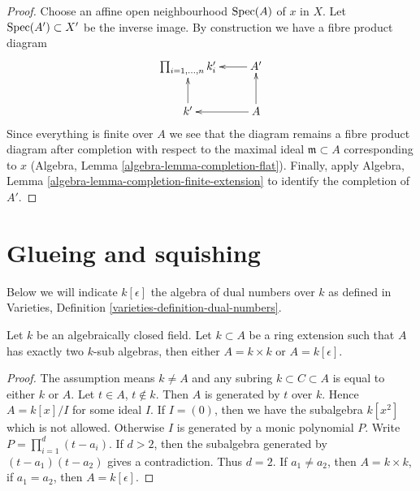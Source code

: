 \begin{proof}
Choose an affine open neighbourhood $\mathop{\mathrm{Spec}}(A)$ of $x$ in $X$.
Let $\mathop{\mathrm{Spec}}(A') \subset X'$ be the inverse image. By construction
we have a fibre product diagram
$$
\xymatrix{
\prod\nolimits_{i = 1, \ldots, n} k'_i &
A' \ar[l] \\
k' \ar[u] &
A \ar[u] \ar[l]
}
$$
Since everything is finite over $A$ we see that the diagram remains
a fibre product diagram after completion with respect to the
maximal ideal $\mathfrak m \subset A$ corresponding to $x$
(Algebra, Lemma \ref{algebra-lemma-completion-flat}).
Finally, apply Algebra, Lemma
\ref{algebra-lemma-completion-finite-extension}
to identify the completion of $A'$.
\end{proof}




\section{Glueing and squishing}
\label{section-glueing-squishing}

\noindent
Below we will indicate $k[\epsilon]$ the algebra of dual numbers
over $k$ as defined in
Varieties, Definition \ref{varieties-definition-dual-numbers}.

\begin{lemma}
\label{lemma-no-in-between-over-k}
Let $k$ be an algebraically closed field. Let $k \subset A$ be a ring
extension such that $A$ has exactly two $k$-sub algebras, then
either $A = k \times k$ or $A = k[\epsilon]$.
\end{lemma}

\begin{proof}
The assumption means $k \not = A$ and any subring $k \subset C \subset A$
is equal to either $k$ or $A$. Let $t \in A$, $t \not \in k$.
Then $A$ is generated by $t$ over $k$. Hence $A = k[x]/I$ for some
ideal $I$. If $I = (0)$, then we have the subalgebra $k[x^2]$
which is not allowed. Otherwise $I$ is generated by a monic polynomial $P$.
Write $P = \prod_{i = 1}^d (t - a_i)$. If $d > 2$, then the subalgebra
generated by $(t - a_1)(t - a_2)$ gives a contradiction.
Thus $d = 2$. If $a_1 \not = a_2$, then $A = k \times k$,
if $a_1 = a_2$, then $A = k[\epsilon]$.
\end{proof}

